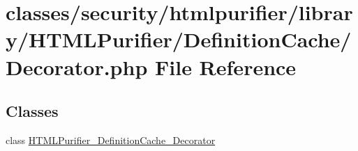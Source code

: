 \hypertarget{Decorator_8php}{\section{classes/security/htmlpurifier/library/\+H\+T\+M\+L\+Purifier/\+Definition\+Cache/\+Decorator.php File Reference}
\label{Decorator_8php}
}
\subsection*{Classes}
\begin{DoxyCompactItemize}
\item 
class \hyperlink{classHTMLPurifier__DefinitionCache__Decorator}{H\+T\+M\+L\+Purifier\+\_\+\+Definition\+Cache\+\_\+\+Decorator}
\end{DoxyCompactItemize}
